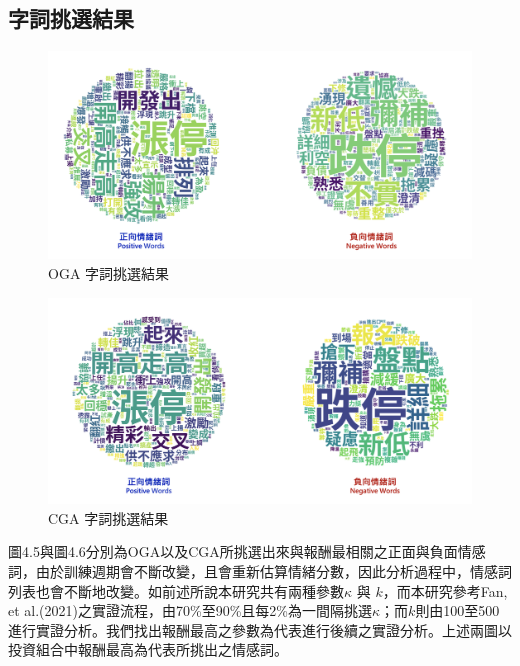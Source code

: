 \subsection{字詞挑選結果}
\begin{figure}[htbp]
\centering
\includegraphics[width=1.1\textwidth]{images/OGA result.png}
\caption{OGA 字詞挑選結果}
\end{figure}

\begin{figure}[htbp]
\centering
\includegraphics[width=1.1\textwidth]{images/CGA result.png}
\caption{CGA 字詞挑選結果}
\end{figure}
圖4.5與圖4.6分別為OGA以及CGA所挑選出來與報酬最相關之正面與負面情感詞，由於訓練週期會不斷改變，且會重新估算情緒分數，因此分析過程中，情感詞列表也會不斷地改變。如前述所說本研究共有兩種參數$\kappa$ 與 $k$，而本研究參考Fan, et al.(2021)之實證流程，由70\%至90\%且每2\%為一間隔挑選$\kappa$；而$k$則由100至500進行實證分析。我們找出報酬最高之參數為代表進行後續之實證分析。上述兩圖以投資組合中報酬最高為代表所挑出之情感詞。


